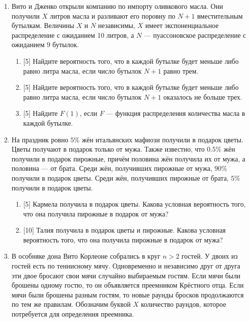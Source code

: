 \documentclass[12pt]{article} %
\begin{document}
\begin{enumerate}
\item Вито и Дженко открыли компанию по импорту оливкового масла. 
Они получили $X$ литров масла и разливают его поровну по $N+1$ вместительным бутылкам. 
Величины $X$ и $N$ независимы, $X$ имеет экспоненциальное распределение с ожиданием 10 литров,
а $N$ — пуассоновское распределение с ожиданием $9$ бутылок. 

\begin{enumerate}
    \item {[5]} Найдите вероятность того, что в каждой бутылке будет меньше либо равно литра масла,
    если число бутылок $N + 1$ равно трем.
    \item {[5]} Найдите вероятность того, что в каждой бутылке будет меньше либо равно литра масла, 
    если число бутылок $N + 1$ оказалось не больше трех. 
    \item {[5]} Найдите $F(1)$, если $F$ — функция распределения количества масла в каждой бутылке.
\end{enumerate}


\item На праздник ровно $5\%$ жён итальянских мафиози получили в подарок цветы. 
Цветы получают в подарок только от мужа. 
Также известно, что $0.5\%$ жён получили в подарок пирожные,
причём половина жён получила их от мужа, а половина — от брата.
Среди жён, получивших пирожные от мужа, $90\%$ получили в подарок цветы. 
Среди жён, получивших пирожные от брата, $5\%$ получили в подарок цветы.

\begin{enumerate}
    \item {[5]} Кармела получила в подарок цветы. 
    Какова условная вероятность того, что она получила пирожные в подарок от мужа?
    \item {[10]} Талия получила в подарок цветы и пирожные. 
    Какова условная вероятность того, что она получила пирожные в подарок от мужа?
\end{enumerate}


\item В особняке дона Вито Корлеоне собрались в круг $n>2$ гостей. 
У двоих из гостей есть по теннисному мячу. 
Одновременно и независимо друг от друга эти двое бросают свои мячи случайно выбираемым гостям. 
Если мячи были брошены одному гостю, то он объявляется преемником Крёстного отца. 
Если мячи были брошены разным гостям, то новые раунды бросков продолжаются по тем же правилам. 
Обозначим буквой $X$ количество раундов, которое потребуется для определения преемника. 


\end{enumerate}
\end{document}
